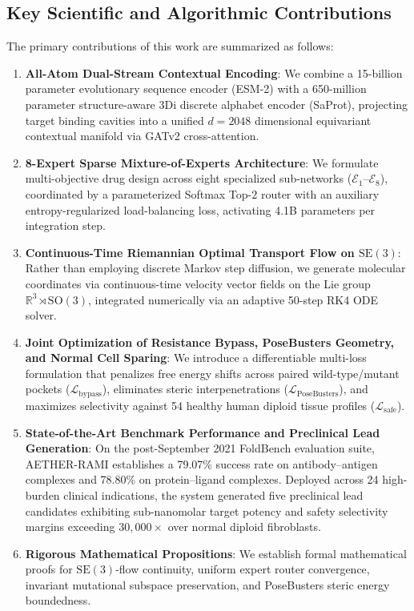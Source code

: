 \subsection{Key Scientific and Algorithmic Contributions}
The primary contributions of this work are summarized as follows:
\begin{enumerate}
    \item \textbf{All-Atom Dual-Stream Contextual Encoding}: We combine a 15-billion parameter evolutionary sequence encoder (ESM-2) with a 650-million parameter structure-aware 3Di discrete alphabet encoder (SaProt), projecting target binding cavities into a unified $d=2048$ dimensional equivariant contextual manifold via GATv2 cross-attention.
    \item \textbf{8-Expert Sparse Mixture-of-Experts Architecture}: We formulate multi-objective drug design across eight specialized sub-networks ($\mathcal{E}_1$--$\mathcal{E}_8$), coordinated by a parameterized Softmax Top-2 router with an auxiliary entropy-regularized load-balancing loss, activating 4.1B parameters per integration step.
    \item \textbf{Continuous-Time Riemannian Optimal Transport Flow on $\mathrm{SE}(3)$}: Rather than employing discrete Markov step diffusion, we generate molecular coordinates via continuous-time velocity vector fields on the Lie group $\mathbb{R}^3 \rtimes \mathrm{SO}(3)$, integrated numerically via an adaptive 50-step RK4 ODE solver.
    \item \textbf{Joint Optimization of Resistance Bypass, PoseBusters Geometry, and Normal Cell Sparing}: We introduce a differentiable multi-loss formulation that penalizes free energy shifts across paired wild-type/mutant pockets ($\mathcal{L}_{\text{bypass}}$), eliminates steric interpenetrations ($\mathcal{L}_{\text{PoseBusters}}$), and maximizes selectivity against 54 healthy human diploid tissue profiles ($\mathcal{L}_{\text{safe}}$).
    \item \textbf{State-of-the-Art Benchmark Performance and Preclinical Lead Generation}: On the post-September 2021 FoldBench evaluation suite, AETHER-RAMI establishes a 79.07\% success rate on antibody--antigen complexes and 78.80\% on protein--ligand complexes. Deployed across 24 high-burden clinical indications, the system generated five preclinical lead candidates exhibiting sub-nanomolar target potency and safety selectivity margins exceeding $30,000\times$ over normal diploid fibroblasts.
    \item \textbf{Rigorous Mathematical Propositions}: We establish formal mathematical proofs for $\mathrm{SE}(3)$-flow continuity, uniform expert router convergence, invariant mutational subspace preservation, and PoseBusters steric energy boundedness.
\end{enumerate}


